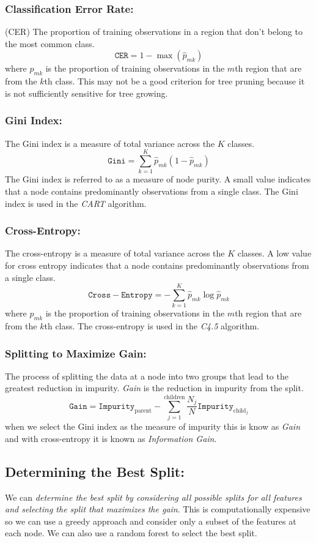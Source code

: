 \subsubsection{Classification Error Rate:} (CER) The proportion of training observations in a region that don't belong to the most common class. \[\mathtt{CER}=1-\max(\hat{p}_{mk})\] where $\hat{p}_{mk}$ is the proportion of training observations in the $m$th region that are from the $k$th class. This may not be a good criterion for tree pruning because it is not sufficiently sensitive for tree growing.
\subsubsection{Gini Index:} The Gini index is a measure of total variance across the $K$ classes. \[\mathtt{Gini}=\sum_{k=1}^{K}\hat{p}_{mk}(1-\hat{p}_{mk})\] The Gini index is referred to as a measure of node purity. A small value indicates that a node contains predominantly observations from a single class. The Gini index is used in the \emph{CART} algorithm.
\subsubsection{Cross-Entropy:} The cross-entropy is a measure of total variance across the $K$ classes. A low value for cross entropy indicates that a node contains predominantly observations from a single class.
 \[\mathtt{Cross-Entropy}=-\sum_{k=1}^{K}\hat{p}_{mk}\log{\hat{p}_{mk}}\] where $\hat{p}_{mk}$ is the proportion of training observations in the $m$th region that are from the $k$th class.
The cross-entropy is used in the \emph{C4.5} algorithm.
\subsubsection{Splitting to Maximize Gain:} The process of splitting the data at a node into two groups that lead to the greatest reduction in impurity. \emph{Gain} is the reduction in impurity from the split. \[\mathtt{Gain}=\mathtt{Impurity}_{\text{parent}}-\sum_{j=1}^{\text{children}}\frac{N_j}{N}\mathtt{Impurity}_{\text{child}_j}\] when we select the Gini index as the measure of impurity this is know as \emph{Gain} and with cross-entropy it is known as \emph{Information Gain}.
\subsection{Determining the Best Split:} We can \emph{determine the best split by considering all possible splits for all features and selecting the split that maximizes the gain}. This is computationally expensive so we can use a greedy approach and consider only a subset of the features at each node. We can also use a random forest to select the best split.
